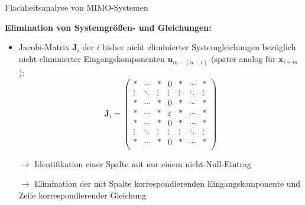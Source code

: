 \documentclass[
	ngerman,
	10pt,				%
	aspectratio=169, 	%
	xcolor=dvipsnames
]{beamer}
\begin{document}
\begin{frame}[t,fragile,label=Flachheit_3]{\large Flachheitsanalyse von MIMO-Systemen}
	
	\textbf{Elimination von Systemgrößen- und Gleichungen:}
	
	\begin{itemize}
		\pause
		\item Jacobi-Matrix $\mathbf{J}_i$ der $i$ bisher nicht eliminierter Systemgleichungen bezüglich nicht eliminierter Eingangskomponenten $\mathbf{u}_{m-(n-i)}$ (später analog für $\mathbf{x}_{i+m}$): \\
		\pause
		\begin{equation*}
			\mathbf{J}_i = 
			\begin{pmatrix}
				* & \cdots & * & 0 & * & \cdots & *\\
				\vdots & \ddots & \vdots & \vdots & \vdots & \ddots & \vdots \\
				* & \cdots & * & 0 & * & \cdots & *  \\
				* & \cdots & * & \varepsilon & * & \cdots & * \\
				* & \cdots & * & 0 & * & \cdots & *  \\
				\vdots & \ddots & \vdots & \vdots & \vdots & \ddots & \vdots \\
				* & \cdots & * & 0 & * & \cdots & *\\
			\end{pmatrix}
		\end{equation*}
		\pause
		\item[$\rightarrow$] Identifikation einer Spalte mit nur einem nicht-Null-Eintrag
		\pause
		\item[$\rightarrow$] Elimination der mit Spalte korrespondierenden Eingangskomponente und Zeile korrespondierender Gleichung
	\end{itemize}
	
\end{frame}

\end{document}
